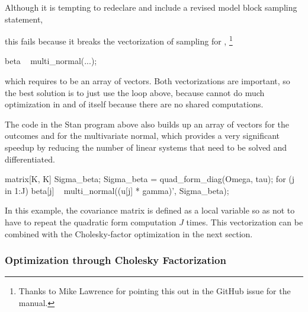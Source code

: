 Although it is tempting to redeclare  and include a revised
model block sampling statement,
%
\begin{stancode}
parameters {
  matrix[J, K] beta;
...
model {
  y ~ normal(rows_dot_product(x, beta[jj]), sigma);
  ...
\end{stancode}
%
this fails because it breaks the vectorization of sampling for
,%
%
\footnote{Thanks to Mike Lawrence for pointing this out in the GitHub
  issue for the manual.}
%
\begin{stancode}
  beta ~ multi_normal(...);
\end{stancode}
%
which requires  to be an array of vectors.  Both
vectorizations are important, so the best solution is to just use the
loop above, because  cannot do much
optimization in and of itself because there are no shared computations.

The code in the Stan program above also builds up an array of vectors
for the outcomes and for the multivariate normal, which provides a
very significant speedup by reducing the number of linear systems that
need to be solved and differentiated.
%
\begin{stancode}
  {
    matrix[K, K] Sigma_beta;
    Sigma_beta = quad_form_diag(Omega, tau);
    for (j in 1:J)
      beta[j] ~ multi_normal((u[j] * gamma)', Sigma_beta);
  }
\end{stancode}
%
In this example, the covariance matrix  is defined
as a local variable so as not to have to repeat the quadratic form
computation $J$ times.  This vectorization can be combined with the
Cholesky-factor optimization in the next section.

\subsubsection{Optimization through Cholesky Factorization}

